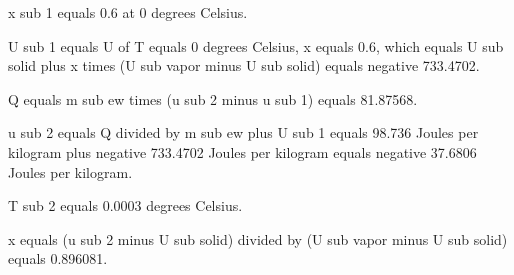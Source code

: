 x sub 1 equals 0.6 at 0 degrees Celsius.

U sub 1 equals U of T equals 0 degrees Celsius, x equals 0.6, which equals U sub solid plus x times (U sub vapor minus U sub solid) equals negative 733.4702.

Q equals m sub ew times (u sub 2 minus u sub 1) equals 81.87568.

u sub 2 equals Q divided by m sub ew plus U sub 1 equals 98.736 Joules per kilogram plus negative 733.4702 Joules per kilogram equals negative 37.6806 Joules per kilogram.

T sub 2 equals 0.0003 degrees Celsius.

x equals (u sub 2 minus U sub solid) divided by (U sub vapor minus U sub solid) equals 0.896081.